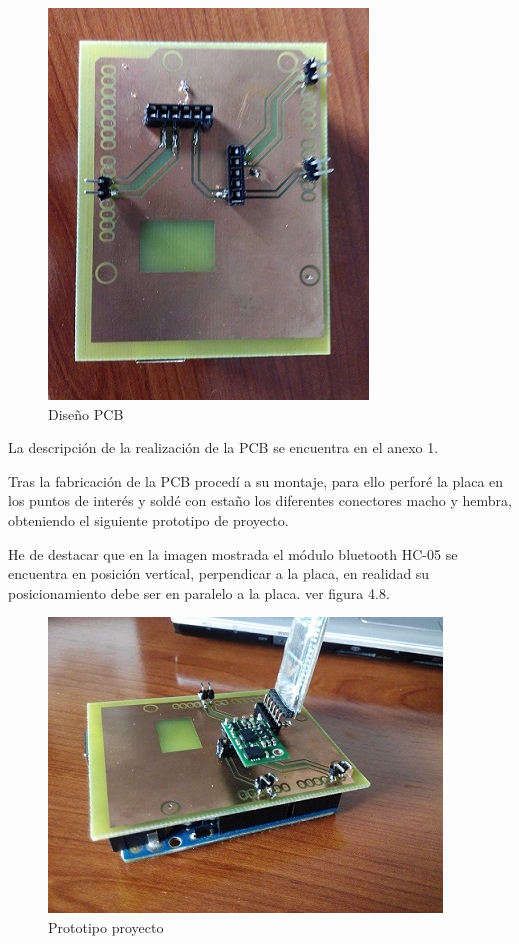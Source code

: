 		\begin{figure}[h]
			\centering
			\includegraphics{imagenes/PCB.jpg}
			\caption{Dise\~no PCB}
			\label{contexto:figura}
		\end{figure}
		
		La descripción de la realización de la PCB se encuentra en el anexo 1.
		
		Tras la fabricación de la PCB procedí a su montaje, para ello perforé la placa en los puntos de interés y soldé con esta\~no los  diferentes conectores macho y hembra, obteniendo el siguiente prototipo de proyecto.
		
		He de destacar que en la imagen mostrada el módulo bluetooth HC-05 se encuentra en posición vertical, perpendicar a la placa, en realidad su posicionamiento debe ser en paralelo a la placa. ver figura 4.8.
		
		\begin{figure}[h]
			\centering
			\includegraphics{imagenes/prototipo.jpg}
			\caption{Prototipo proyecto}
			\label{contexto:figura}
		\end{figure}
		
		\newpage
		$\ $
